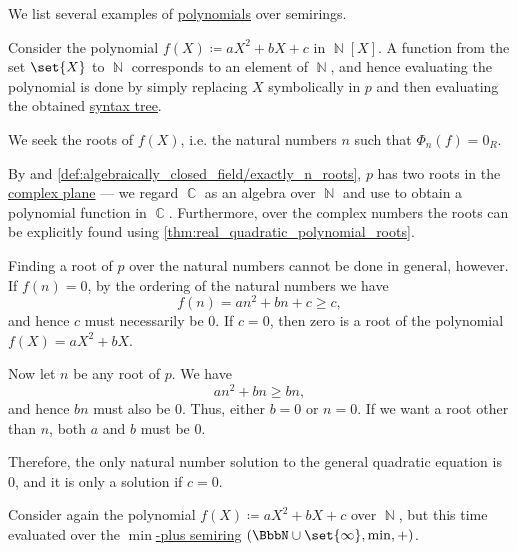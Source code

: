 \begin{example}\label{ex:def:polynomial_algebra}
  We list several examples of \hyperref[def:polynomial_algebra]{polynomials} over semirings.
  \begin{thmenum}
     Consider the polynomial \( f(X) \coloneqq aX^2 + bX + c \) in \( \BbbN[X] \). A function from the set \( \set{ X } \) to \( \BbbN \) corresponds to an element of \( \BbbN \), and hence evaluating the polynomial is done by simply replacing \( X \) symbolically in \( p \) and then evaluating the obtained \hyperref[rem:binary_operation_syntax_trees]{syntax tree}.

    We seek the roots of \( f(X) \), i.e. the natural numbers \( n \) such that \( \Phi_n(f) = 0_R \).

    By  and \cref{def:algebraically_closed_field/exactly_n_roots}, \( p \) has two roots in the \hyperref[def:complex_numbers]{complex plane} --- we regard \( \BbbC \) as an algebra over \( \BbbN \) and use  to obtain a polynomial function in \( \BbbC \). Furthermore, over the complex numbers the roots can be explicitly found using \cref{thm:real_quadratic_polynomial_roots}.

    Finding a root of \( p \) over the natural numbers cannot be done in general, however. If \( f(n) = 0 \), by the ordering of the natural numbers we have
    \begin{equation*}
      f(n) = an^2 + bn + c \geq c,
    \end{equation*}
    and hence \( c \) must necessarily be \( 0 \). If \( c = 0 \), then zero is a root of the polynomial \( f(X) = aX^2 + bX \).

    Now let \( n \) be any root of \( p \). We have
    \begin{equation*}
      an^2 + bn \geq bn,
    \end{equation*}
    and hence \( bn \) must also be \( 0 \). Thus, either \( b = 0 \) or \( n = 0 \). If we want a root other than \( n \), both \( a \) and \( b \) must be \( 0 \).

    Therefore, the only natural number solution to the general quadratic equation is \( 0 \), and it is only a solution if \( c = 0 \).

     Consider again the polynomial \( f(X) \coloneqq aX^2 + bX + c \) over \( \BbbN \), but this time evaluated over the \hyperref[def:tropical_semiring]{\( \min \)-plus semiring} \( (\BbbN \cup \set{ \infty }, \min, +) \).


\end{thmenum}
\end{example}
